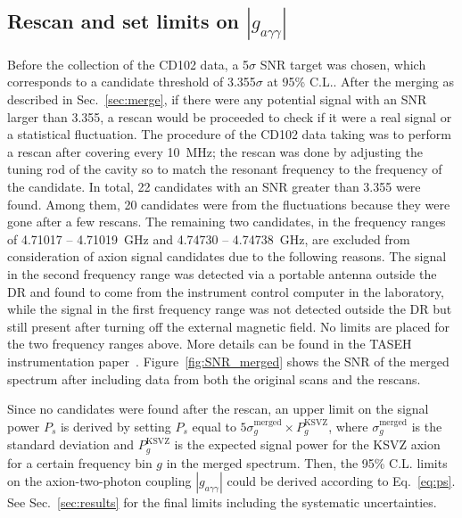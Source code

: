 \documentclass[%
reprint, %
superscriptaddress,
 amsmath,amssymb,
 aps
]{revtex4-2}
\begin{document}
\subsection{Rescan and set limits on $\left|g_{a\gamma\gamma}\right|$} 
Before the collection of the CD102 data, a 5$\sigma$ SNR target was chosen, 
which corresponds to a candidate threshold of 3.355$\sigma$ at 95\% C.L..
 After the merging as described in Sec.~\ref{sec:merge}, if there were 
any potential signal with an SNR larger than 
3.355, a rescan would be proceeded to check if it were a real signal 
or a statistical fluctuation. 
The procedure of the CD102 data taking was to perform a rescan after 
covering every 10~MHz; the rescan was done by adjusting the tuning rod of the 
cavity so to match the resonant frequency to the frequency of the candidate. 
In total, 22 candidates with an SNR greater than 3.355 were found. 
Among them, 20 candidates were from the fluctuations because they were gone 
after a few rescans. The remaining two candidates, 
in the frequency ranges of 4.71017 -- 4.71019~GHz and 4.74730 -- 4.74738~GHz, 
are excluded from consideration of axion signal candidates due to the 
following reasons. 
The signal in the second frequency range 
was detected via a portable antenna outside the DR and found 
to come from the instrument control computer in the laboratory, while the 
signal in the first frequency range 
was not detected outside the DR but 
still present after turning off the external magnetic field. 
No limits are placed for the two frequency ranges above.  
More details can be found in the 
TASEH instrumentation paper~\cite{TASEHInstrumentation}. 
Figure~\ref{fig:SNR_merged} shows the SNR of the merged spectrum after 
including data from both the original scans and the rescans. 

Since no candidates were found after the rescan, an upper limit on 
the signal power $P_s$ is derived by setting $P_s$ equal to 
$5\sigma_{g}^\text{merged}\times P_{g}^\text{KSVZ}$, where 
$\sigma_{g}^\text{merged}$ is the standard deviation 
and $P_{g}^\text{KSVZ}$ is the expected signal power for the KSVZ axion 
for a certain frequency bin $g$ in the merged spectrum. 
Then, the 95\% C.L. limits on the axion-two-photon coupling 
$\left|g_{a\gamma\gamma}\right|$ could be derived according to 
Eq.~\eqref{eq:ps}. 
See Sec.~\ref{sec:results} for the final limits including the systematic 
uncertainties.
\end{document}
